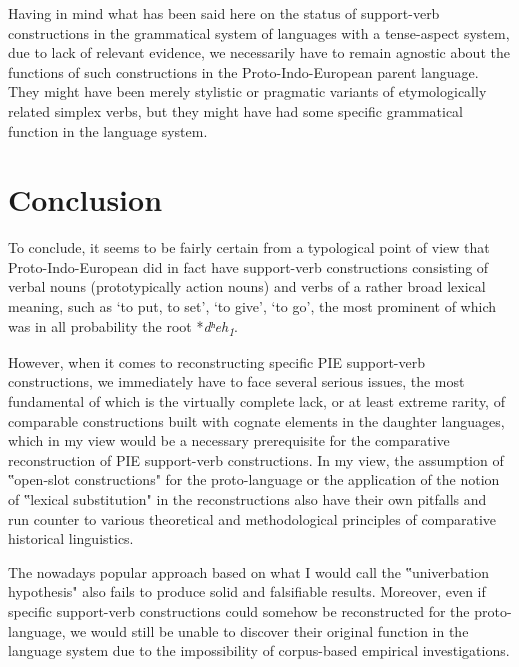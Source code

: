 \documentclass[output=paper,colorlinks,citecolor=brown]{langscibook}
\begin{document}
Having in mind what has been said here on the status of support-verb constructions in the grammatical system of languages with a tense-aspect system, due to lack of relevant evidence, we necessarily have to remain agnostic about the functions of such constructions in the Proto-Indo-European parent language. They might have been merely stylistic or pragmatic variants of etymologically related simplex verbs, but they might have had some specific grammatical function in the language system.

\section{Conclusion}

To conclude, it seems to be fairly certain from a typological point of view that Proto-Indo-European did in fact have support-verb constructions consisting of verbal nouns (prototypically action nouns) and verbs of a rather broad lexical meaning, such as ‘to put, to set’, ‘to give’, ‘to go’, the most prominent of which was in all probability the root *\textit{dʰeh\textsubscript{1}}.

However, when it comes to reconstructing specific PIE support-verb constructions, we immediately have to face several serious issues, the most fundamental of which is the virtually complete lack, or at least extreme rarity, of comparable constructions built with cognate elements in the daughter languages, which in my view would be a necessary prerequisite for the comparative reconstruction of PIE support-verb constructions. In my view, the assumption of ‟open-slot constructions" for the proto-language or the application of the notion of ‟lexical substitution" in the reconstructions also have their own pitfalls and run counter to various theoretical and methodological principles of comparative historical linguistics. 


The nowadays popular approach based on what I would call the ‟univerbation hypothesis" also fails to produce solid and falsifiable results. Moreover, even if specific support-verb constructions could somehow be reconstructed for the proto-language, we would still be unable to discover their original function in the language system due to the impossibility of corpus-based empirical investigations.
\end{document}
